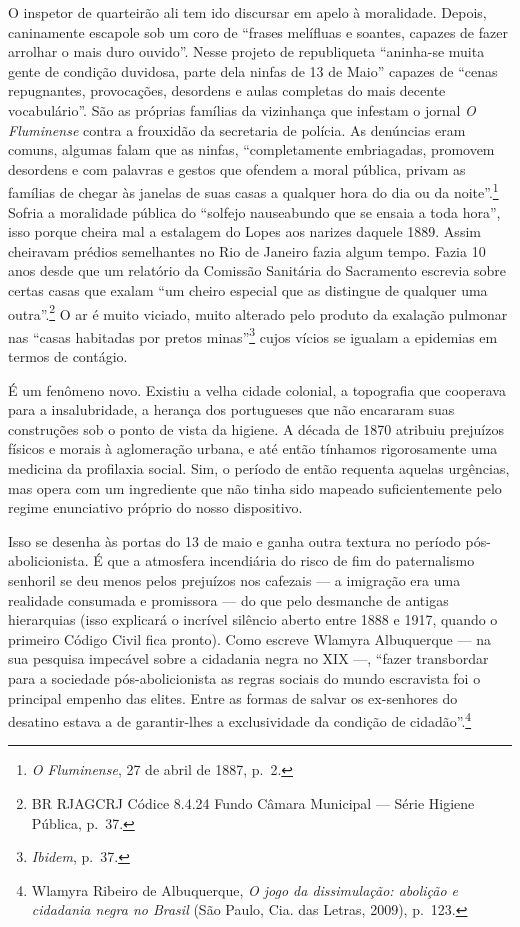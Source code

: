 O inspetor de quarteirão ali tem ido discursar em apelo à moralidade.
Depois, caninamente escapole sob um coro de ``frases melífluas e
soantes, capazes de fazer arrolhar o mais duro ouvido''. Nesse projeto
de republiqueta ``aninha-se muita gente de condição duvidosa, parte dela
ninfas de 13 de Maio'' capazes de ``cenas repugnantes, provocações,
desordens e aulas completas do mais decente vocabulário''. São as
próprias famílias da vizinhança que infestam o jornal \textit{O
Fluminense} contra a frouxidão da secretaria de polícia. As denúncias
eram comuns, algumas falam que as ninfas, ``completamente embriagadas,
promovem desordens e com palavras e gestos que ofendem a moral pública,
privam as famílias de chegar às janelas de suas casas a qualquer hora do
dia ou da noite''.\footnote{\textit{O Fluminense}, 27 de abril de 1887,
  p.~2.} Sofria a moralidade pública do ``solfejo nauseabundo que se
ensaia a toda hora'', isso porque cheira mal a estalagem do Lopes aos
narizes daquele 1889. Assim cheiravam prédios semelhantes no Rio de
Janeiro fazia algum tempo. Fazia 10 anos desde que um relatório da
Comissão Sanitária do Sacramento escrevia sobre certas casas que exalam
``um cheiro especial que as distingue de qualquer uma outra''.\footnote{BR
  RJAGCRJ Códice 8.4.24 Fundo Câmara Municipal --- Série Higiene Pública,
  p.~37.} O ar é muito viciado, muito alterado pelo produto da exalação
pulmonar nas ``casas habitadas por pretos minas''\footnote{\textit{Ibidem},
  p.~37.} cujos vícios se igualam a epidemias em termos de contágio.

É um fenômeno novo. Existiu a velha cidade colonial, a topografia que
cooperava para a insalubridade, a herança dos portugueses que não
encararam suas construções sob o ponto de vista da higiene. A década de
1870 atribuiu prejuízos físicos e morais à aglomeração urbana, e até
então tínhamos rigorosamente uma medicina da profilaxia social. Sim, o
período de então requenta aquelas urgências, mas opera com um
ingrediente que não tinha sido mapeado suficientemente pelo regime
enunciativo próprio do nosso dispositivo.

Isso se desenha às portas do 13 de maio e ganha outra textura no período
pós-abolicionista. É que a atmosfera incendiária do risco de fim do
paternalismo senhoril se deu menos pelos prejuízos nos cafezais --- a
imigração era uma realidade consumada e promissora --- do que pelo
desmanche de antigas hierarquias (isso explicará o incrível silêncio
aberto entre 1888 e 1917, quando o primeiro Código Civil fica pronto).
Como escreve Wlamyra Albuquerque --- na sua pesquisa impecável sobre a
cidadania negra no XIX ---, ``fazer transbordar para a sociedade
pós-abolicionista as regras sociais do mundo escravista foi o principal
empenho das elites. Entre as formas de salvar os ex-senhores do desatino
estava a de garantir-lhes a exclusividade da condição de
cidadão''.\footnote{Wlamyra Ribeiro de Albuquerque, \textit{O jogo da
  dissimulação: abolição e cidadania negra no Brasil} (São Paulo, Cia.
  das Letras, 2009), p.~123.}

